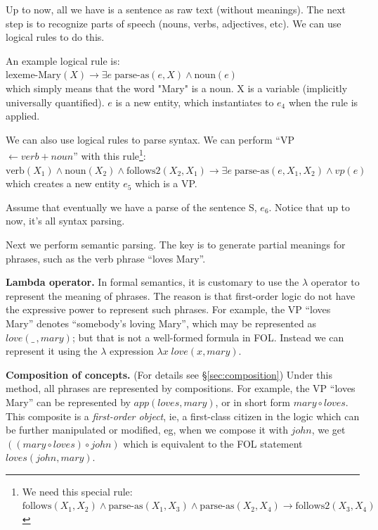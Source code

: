 Up to now, all we have is a sentence as raw text (without meanings).  The next step is to recognize parts of speech (nouns, verbs, adjectives, etc). We can use logical rules to do this.

An example logical rule is:\\
\hspace*{1cm} $\mbox{lexeme-Mary}(X) \rightarrow \exists e \; \mbox{parse-as}(e, X) \wedge \mbox{noun}(e)$\\
which simply means that the word "Mary" is a noun. X is a variable (implicitly universally quantified). $e$ is a new entity, which instantiates to $e_4$ when the rule is applied.

We can also use logical rules to parse syntax. We can perform ``VP $\leftarrow verb + noun$'' with this rule\footnote{We need this special rule:\\
\hspace*{1cm} $\mbox{follows}(X_1, X_2) \wedge \mbox{parse-as}(X_1, X_3) \wedge \mbox{parse-as}(X_2, X_4) \rightarrow \mbox{follows2}(X_3, X_4)$ }:\\
\hspace*{1cm} $\mbox{verb}(X_1) \wedge \mbox{noun}(X_2) \wedge \mbox{follows2}(X_2, X_1) \rightarrow \exists e \; \mbox{parse-as}(e, X_1, X_2) \wedge vp(e)$\\
which creates a new entity $e_5$ which is a VP.

Assume that eventually we have a parse of the sentence S, $e_6$. Notice that up to now, it's all syntax parsing.

Next we perform semantic parsing.  The key is to generate partial meanings for phrases, such as the verb phrase ``loves Mary''.

\textbf{Lambda operator.}  In formal semantics, it is customary to use the $\lambda$ operator to represent the meaning of phrases.  The reason is that first-order logic do not have the expressive power to represent such phrases.  For example, the VP ``loves Mary'' denotes ``somebody's loving Mary'', which may be represented as $love(\_ \,,mary)$; but that is not a well-formed formula in FOL.  Instead we can represent it using the $\lambda$ expression $\lambda x \; love(x,mary)$.

\textbf{Composition of concepts.}  (For details see \S\ref{sec:composition})  Under this method, all phrases are represented by compositions.  For example, the VP ``loves Mary'' can be represented by $app(loves,mary)$, or in short form $mary \circ loves$.  This composite is a \textit{first-order object}, ie, a first-class citizen in the logic which can be further manipulated or modified, eg, when we compose it with $john$, we get $((mary \circ loves) \circ john)$ which is equivalent to the FOL statement $loves(john,mary)$.

